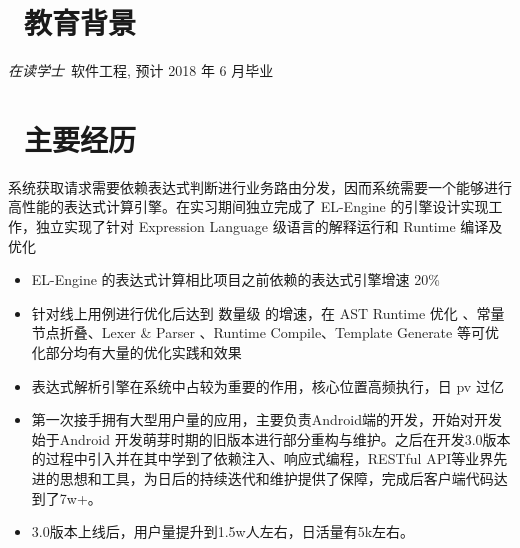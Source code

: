 \documentclass{resume}
\begin{document}



\section{\faGraduationCap\  教育背景}
\textit{在读学士}\ 软件工程, 预计 2018 年 6 月毕业

\section{\faUsers\ 主要经历}
\role{项目开发者和主要维护者}

系统获取请求需要依赖表达式判断进行业务路由分发，因而系统需要一个能够进行高性能的表达式计算引擎。在实习期间独立完成了 EL-Engine 的引擎设计实现工作，独立实现了针对 Expression Language 级语言的解释运行和 Runtime 编译及优化

\begin{itemize}
  \item EL-Engine 的表达式计算相比项目之前依赖的表达式引擎增速 20\%
  \item 针对线上用例进行优化后达到 数量级 的增速，在 AST Runtime 优化 、常量节点折叠、Lexer \& Parser 、Runtime Compile、Template Generate  等可优化部分均有大量的优化实践和效果
  \item 表达式解析引擎在系统中占较为重要的作用，核心位置高频执行，日 pv 过亿
\end{itemize}


\begin{itemize}
  \item 第一次接手拥有大型用户量的应用，主要负责Android端的开发，开始对开发始于Android 开发萌芽时期的旧版本进行部分重构与维护。之后在开发3.0版本的过程中引入并在其中学到了依赖注入、响应式编程，RESTful API等业界先进的思想和工具，为日后的持续迭代和维护提供了保障，完成后客户端代码达到了7w+。
  \item 3.0版本上线后，用户量提升到1.5w人左右，日活量有5k左右。
\end{itemize}
\end{document}
